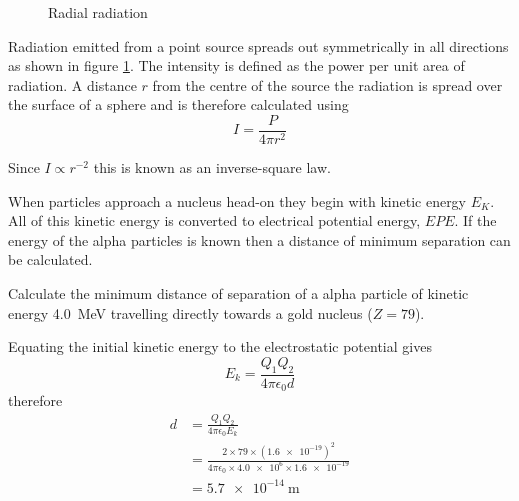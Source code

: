 \documentclass[revision-guide.tex]{subfiles}
\begin{document}

\begin{figure}[h]
  \begin{center}
  \end{center}
  \caption{Radial radiation}
  \label{radiation-spreading}
\end{figure}

Radiation emitted from a point source spreads out symmetrically in all directions as shown in figure \ref{radiation-spreading}. The intensity is defined as the power per unit area of radiation. A distance $r$ from the centre of the source the radiation is spread over the surface of a sphere and is therefore calculated using
\begin{equation}
  I = \frac{P}{4\pi r^2}
\end{equation}

Since $I\propto r^{-2}$ this is known as an inverse-square law.


When particles approach a nucleus head-on they begin with kinetic energy $E_K$. All of this kinetic energy is converted to electrical potential energy, $EPE$. If the energy of the alpha particles is known then a distance of minimum separation can be calculated.

\begin{example}
  Calculate the minimum distance of separation of a alpha particle of kinetic energy \SI{4.0}{\mega\electronvolt} travelling directly towards a gold nucleus ($Z=79$).

  \answer

  Equating the initial kinetic energy to the electrostatic potential gives
  \[ E_k = \frac{Q_1 Q_2}{4\pi \epsilon_0 d} \]
  therefore
  \begin{align*}
    d &= \frac{Q_1 Q_2}{4 \pi \epsilon_0 E_k} \\
    &= \frac{2\times79\times (\num{1.6e-19})^2}{4\pi \epsilon_0 \times \num{4.0e6} \times \num{1.6e-19}} \\
    &= \SI{5.7e-14}{\meter}
  \end{align*}
\end{example}
\end{document}
